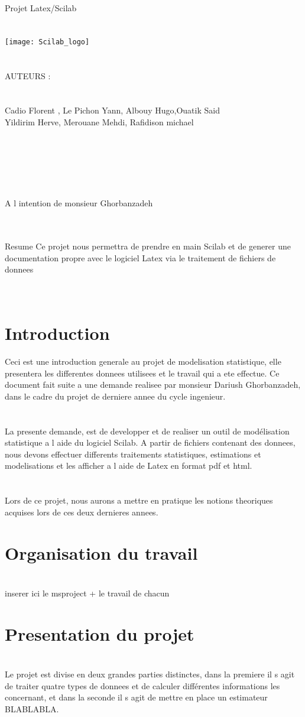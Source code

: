 \documentclass[a4paper,12pt,reqno]{article}
\newcommand{\newparagraphe}[1]{\paragraph{#1}\mbox{}\\}
\begin{document}
\begin{center}
{ \huge Projet Latex/Scilab} 
\newparagraphe{}
\texttt{[image: Scilab\_logo]}
\newparagraphe{}
AUTEURS :
\newparagraphe{}
 Cadio Florent , Le Pichon Yann, Albouy Hugo,Ouatik Said\\ Yildirim Herve, Merouane Mehdi, Rafidison michael 
\newparagraphe{}
\newparagraphe{}
\newparagraphe{}
{ A l intention de monsieur Ghorbanzadeh} 
\end{center}
\newparagraphe{}
\begin{Resume}
Resume Ce projet nous permettra de prendre en main Scilab et de generer une documentation propre avec le logiciel Latex via le traitement de fichiers de donnees
\end{Resume}
\pagebreak 
\tableofcontents 
\cleardoublepage
\pagestyle{plain}
\newparagraphe{}
\section{Introduction}
Ceci est une introduction generale au projet de modelisation statistique, elle presentera les differentes donnees utilisees et le travail qui a ete effectue. Ce document fait suite a une demande realisee par monsieur Dariush Ghorbanzadeh, dans le cadre du projet de derniere annee du cycle ingenieur. 
\newparagraphe{}
La presente demande, est de developper et de realiser un outil de modélisation statistique a l aide du logiciel Scilab. A partir de fichiers contenant des donnees, nous devons effectuer differents traitements statistiques,  estimations et modelisations et les afficher a l aide de Latex en format pdf et html.
\newparagraphe{}
Lors de ce projet, nous aurons a mettre en pratique  les notions theoriques acquises lors de ces deux dernieres annees.
\pagebreak 

\section{Organisation du travail}
\newparagraphe{}

inserer ici le msproject + le travail de chacun
\pagebreak 

\section{Presentation du projet}
\newparagraphe{}

Le projet est divise en deux grandes parties distinctes, dans la premiere il s agit de traiter quatre types de donnees et de calculer différentes informations les concernant, et dans la seconde il s agit de mettre en place un estimateur BLABLABLA.
\end{document}
